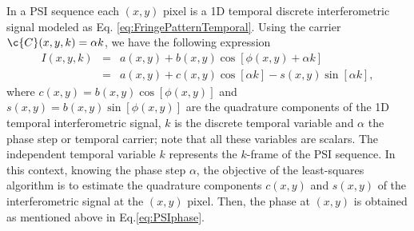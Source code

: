In a PSI sequence each $(x,y)$ pixel is a 1D temporal discrete interferometric 
signal modeled as Eq. \eqref{eq:FringePatternTemporal}. Using the carrier 
$\c{C}(x,y,k)=\alpha k$, we have the following expression
\begin{eqnarray}
  I(x,y,k) &=& a(x,y) + b(x,y)\cos[\phi(x,y) +\alpha k] \nonumber \\
  &=& a(x,y) + c(x,y)\cos[\alpha k] - s(x,y)\sin[\alpha k],
  \label{eq:PSI_Sequence}
\end{eqnarray}
where $c(x,y)=b(x,y)\cos[\phi(x,y)]$ and
$s(x,y)=b(x,y)\sin[\phi(x,y)]$ are the quadrature components of the
1D temporal interferometric signal, $k$ is the discrete temporal
variable and $\alpha$ the phase step or temporal carrier; note that
all these variables are scalars. The independent temporal variable $k$
represents the $k$-frame of the PSI sequence. In this context, knowing
the phase step $\alpha$, the objective of the least-squares algorithm is to 
estimate the quadrature components $c(x,y)$ and $s(x,y)$ of the interferometric
signal at the $(x,y)$ pixel. Then, the phase at $(x,y)$ is obtained as 
mentioned above in Eq.\eqref{eq:PSIphase}.


